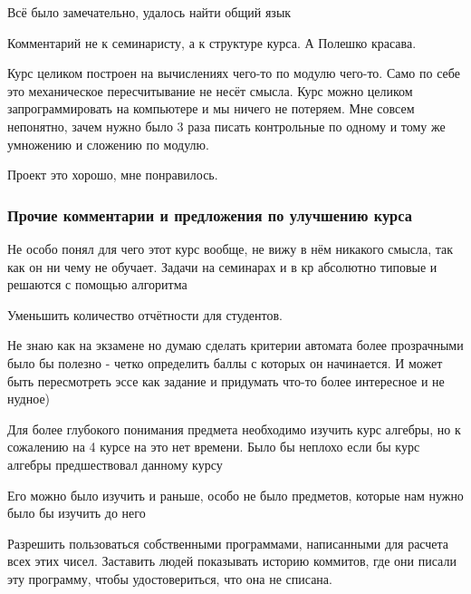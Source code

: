             \begin{commentbox} 
                Всё было замечательно, удалось найти общий язык 
            \end{commentbox} 
        
            \begin{commentbox} 
                Комментарий не к семинаристу, а к структуре курса. А Полешко красава.
        
                Курс целиком построен на вычислениях чего-то по модулю чего-то. Само по себе это механическое пересчитывание не несёт смысла. Курс можно целиком запрограммировать на компьютере и мы ничего не потеряем. Мне совсем непонятно, зачем нужно было 3 раза писать контрольные по одному и тому же умножению и сложению по модулю.
                
                Проект это хорошо, мне понравилось. 
            \end{commentbox} 

    
    \subsubsection{Прочие комментарии и предложения по улучшению курса}
            \begin{commentbox}
                Не особо понял для чего этот курс вообще, не вижу в нём никакого смысла, так как он ни чему не обучает. Задачи на семинарах и в кр абсолютно типовые и решаются с помощью алгоритма
            \end{commentbox}

            \begin{commentbox}
                Уменьшить количество отчётности для студентов.
            \end{commentbox}

            \begin{commentbox}
                Не знаю как на экзамене но думаю сделать критерии автомата более прозрачными было бы полезно - четко определить баллы с которых он начинается. И может быть пересмотреть эссе как задание и придумать что-то более интересное и не нудное)
            \end{commentbox}

            \begin{commentbox}
                Для более глубокого понимания предмета необходимо изучить курс алгебры, но к сожалению на 4 курсе на это нет времени. Было бы неплохо если бы курс алгебры предшествовал данному курсу
            \end{commentbox}

            \begin{commentbox}
                Его можно было изучить и раньше, особо не было предметов, которые нам нужно было бы изучить до него
            \end{commentbox}

            \begin{commentbox}
                Разрешить пользоваться собственными программами, написанными для расчета  всех этих чисел. Заставить людей показывать историю коммитов, где они писали эту программу, чтобы удостовериться, что она не списана.
            \end{commentbox}
            